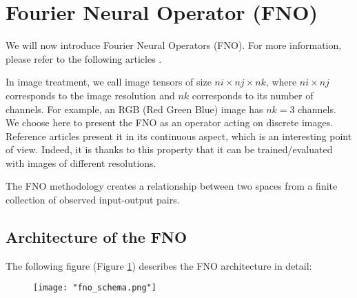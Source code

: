 \section{Fourier Neural Operator (FNO)} \label{FNO}
\graphicspath{{images/fourier}}


We will now introduce Fourier Neural Operators (FNO). For more information, please refer to the following articles .


In image treatment, we call image tensors of size $ni\times nj\times nk$, where $ni\times nj$ corresponds to the image resolution and $nk$ corresponds to its number of channels. For example, an RGB (Red Green Blue) image has $nk=3$ channels. 
We choose here to present the FNO as an operator acting on discrete images. Reference articles present it in its continuous aspect, which is an interesting point of view. Indeed, it is thanks to this property that it can be trained/evaluated with images of different resolutions.

The FNO methodology creates a relationship between two spaces from a finite collection of observed input-output pairs. 


\subsection{Architecture of the FNO}


The following figure (Figure \ref{FNO_schema}) describes the FNO architecture in detail:

\begin{figure}[H]
	\texttt{[image: "fno\_schema.png"]}
	\label{FNO_schema}
\end{figure}

